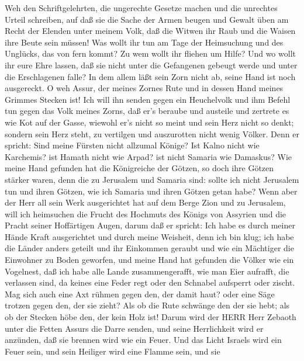  Weh den Schriftgelehrten, die ungerechte Gesetze machen und
die unrechtes Urteil schreiben,  auf daß sie die Sache der
Armen beugen und Gewalt üben am Recht der Elenden unter meinem Volk, daß
die Witwen ihr Raub und die Waisen ihre Beute sein müssen! 
Was wollt ihr tun am Tage der Heimsuchung und des Unglücks, das von fern
kommt? Zu wem wollt ihr fliehen um Hilfe? Und wo wollt ihr eure Ehre
lassen,  daß sie nicht unter die Gefangenen gebeugt werde
und unter die Erschlagenen falle? In dem allem läßt sein Zorn nicht ab,
seine Hand ist noch ausgereckt.  O weh Assur, der meines
Zornes Rute und in dessen Hand meines Grimmes Stecken ist! 
Ich will ihn senden gegen ein Heuchelvolk und ihm Befehl tun gegen das
Volk meines Zorns, daß er's beraube und austeile und zertrete es wie Kot
auf der Gasse,  wiewohl er's nicht so meint und sein Herz
nicht so denkt; sondern sein Herz steht, zu vertilgen und auszurotten
nicht wenig Völker.  Denn er spricht: Sind meine Fürsten
nicht allzumal Könige?  Ist Kalno nicht wie Karchemis? ist
Hamath nicht wie Arpad? ist nicht Samaria wie Damaskus? 
Wie meine Hand gefunden hat die Königreiche der Götzen, so doch ihre
Götzen stärker waren, denn die zu Jerusalem und Samaria sind:
 sollte ich nicht Jerusalem tun und ihren Götzen, wie ich
Samaria und ihren Götzen getan habe?  Wenn aber der Herr
all sein Werk ausgerichtet hat auf dem Berge Zion und zu Jerusalem, will
ich heimsuchen die Frucht des Hochmuts des Königs von Assyrien und die
Pracht seiner Hoffärtigen Augen,  darum daß er spricht: Ich
habe es durch meiner Hände Kraft ausgerichtet und durch meine Weisheit,
denn ich bin klug; ich habe die Länder anders geteilt und ihr Einkommen
geraubt und wie ein Mächtiger die Einwohner zu Boden geworfen,
 und meine Hand hat gefunden die Völker wie ein Vogelnest,
daß ich habe alle Lande zusammengerafft, wie man Eier aufrafft, die
verlassen sind, da keines eine Feder regt oder den Schnabel aufsperrt
oder zischt.  Mag sich auch eine Axt rühmen gegen den, der
damit haut? oder eine Säge trotzen gegen den, der sie zieht? Als ob die
Rute schwänge den der sie hebt; als ob der Stecken höbe den, der kein
Holz ist!  Darum wird der HERR Herr Zebaoth unter die
Fetten Assurs die Darre senden, und seine Herrlichkeit wird er anzünden,
daß sie brennen wird wie ein Feuer.  Und das Licht Israels
wird ein Feuer sein, und sein Heiliger wird eine Flamme sein, und sie

